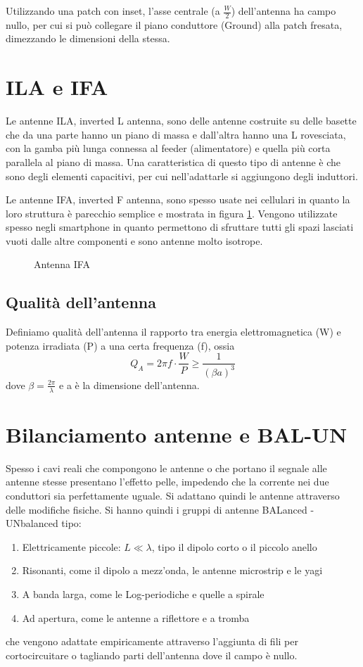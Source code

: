 Utilizzando una patch con inset, l'asse centrale (a $\frac{W}{2}$) dell'antenna ha campo nullo, per cui si può collegare il piano conduttore (Ground) alla patch fresata, dimezzando le dimensioni della stessa.

\section{ILA e IFA}
Le antenne ILA, inverted L antenna,  sono delle antenne costruite su delle basette che da una parte hanno un piano di massa e dall'altra hanno una L rovesciata, con la gamba più lunga connessa al feeder (alimentatore) e quella più corta parallela al piano di massa. Una caratteristica di questo tipo di antenne è che sono degli elementi capacitivi, per cui nell'adattarle si aggiungono degli induttori.

Le antenne IFA, inverted F antenna, sono spesso usate nei cellulari in quanto la loro struttura è parecchio semplice e mostrata in figura \ref{fig:ifa}. Vengono utilizzate spesso negli smartphone in quanto permettono di sfruttare tutti gli spazi lasciati vuoti dalle altre componenti e sono antenne molto isotrope.
\begin{figure}
  \caption{Antenna IFA}
  \label{fig:ifa}
\end{figure}

\subsection{Qualità dell'antenna}
Definiamo qualità dell'antenna il rapporto tra energia elettromagnetica (W) e potenza irradiata (P) a una certa frequenza (f), ossia
\begin{equation}
  Q_A=2\pi f \cdot \frac{W}{P} \ge \frac{1}{(\beta a)^3}
\end{equation}
dove $\beta = \frac{2\pi}{\lambda}$ e a è la dimensione dell'antenna.
\section{Bilanciamento antenne e BAL-UN}
Spesso i cavi reali che compongono le antenne o che portano il segnale alle antenne stesse presentano l'effetto pelle, impedendo che  la corrente nei due conduttori sia perfettamente uguale. Si adattano quindi le antenne attraverso delle modifiche fisiche. Si hanno quindi i gruppi di antenne BALanced - UNbalanced tipo:
\begin{enumerate}
  \item Elettricamente piccole: $L \ll \lambda$, tipo il dipolo corto o il piccolo anello
  \item Risonanti, come il dipolo a mezz'onda, le antenne microstrip e le yagi
  \item A banda larga, come le Log-periodiche e quelle a spirale
  \item Ad apertura, come le antenne a riflettore e a tromba
\end{enumerate}
che vengono adattate empiricamente attraverso l'aggiunta di fili per cortocircuitare o tagliando parti dell'antenna dove il campo è nullo.

